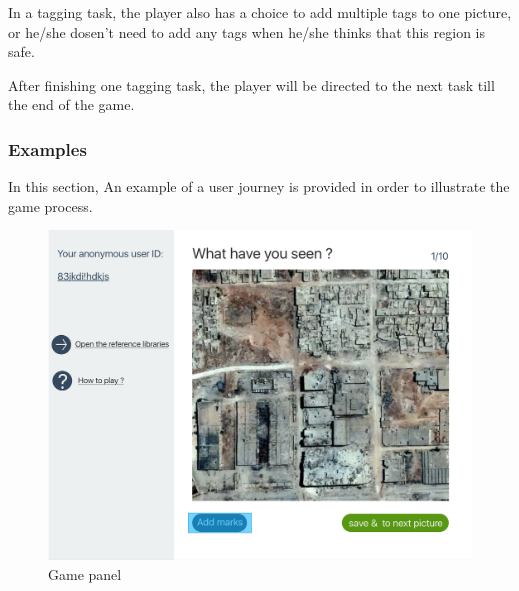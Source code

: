 In a tagging task,
the player also has a choice to add multiple tags to one picture,
or he/she dosen't need to add any tags when he/she thinks that this region is safe.

After finishing one tagging task, 
the player will be directed to the next task till the end of the game.


\subsubsection{Examples}
In this section,
An example of a user journey is provided in order to illustrate the game process.

\noindent\begin{minipage}{.45\textwidth}
\begin{figure}[H]
\centering
\includegraphics[width=\textwidth]{figures/function-player-0}
\caption{Game panel}
\label{fig:player0}
\end{figure}
\end{minipage}\hfill
